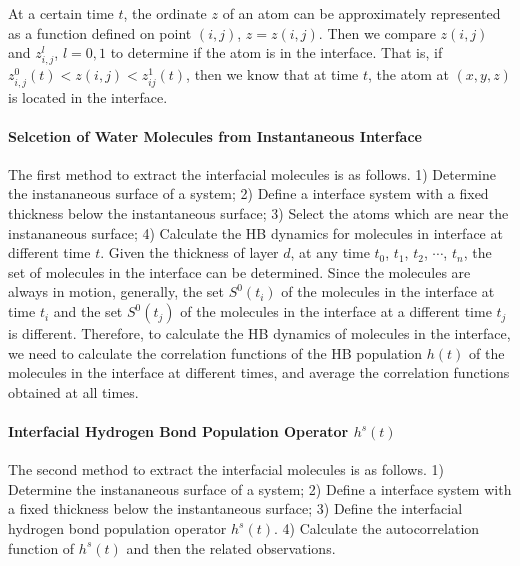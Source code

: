 At a certain time $t$, the ordinate $z$ of an atom can be approximately represented as a function defined on point $(i, j)$, $z=z(i,j)$. 
Then we compare $z(i,j)$ and $z^l_{i,j}$, $l=0,1$ to determine if the atom is in the interface. 
That is, if $z^0_{i,j}(t)<z(i,j)<z^1_{ij}(t)$, then we know that at time $t$, the atom at $(x,y,z)$ is located in the interface.

\paragraph{Selcetion of Water Molecules from Instantaneous Interface}
The first method to extract the interfacial molecules is as follows. 
1) Determine the instananeous surface of a system;
2) Define a interface system with a fixed thickness below the instantaneous surface; 
3) Select the atoms which are near the instananeous surface;
4) Calculate the HB dynamics for molecules in interface at different time $t$.
Given the thickness of layer $d$, at any time $t_0$, $t_1$, $t_2$, $\cdots$, $t_n$, the set of molecules in the interface can be determined. 
Since the molecules are always in motion, generally, the set $S^0(t_i)$ of the molecules in the interface at time $t_i$ 
and the set $S^0(t_j)$ of the molecules in the interface at a different time $t_j$ is different. 
Therefore, to calculate the HB dynamics of molecules in the interface, we need to calculate the correlation functions of 
the HB population $h(t)$ of the molecules in the interface at different times, and average the correlation functions obtained at all times.
 
\paragraph{Interfacial Hydrogen Bond Population Operator $h^s(t)$}
The second method to extract the interfacial molecules is as follows. 
1) Determine the instananeous surface of a system;
2) Define a interface system with a fixed thickness below the instantaneous surface; 
3) Define the interfacial hydrogen bond population operator $h^s(t)$.
4) Calculate the autocorrelation function of $h^s(t)$ and then the related observations. 

